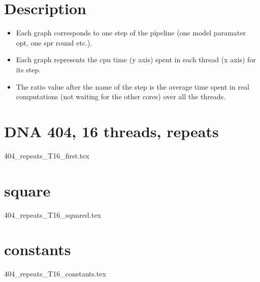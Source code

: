 \documentclass[12pt,a4paper]{article}
\begin{document}
\newcommand*{\figuretitle}[1]{%
    {\centering%
    \textbf{#1}%
    \par\medskip}%
}

\section{Description}
\begin{itemize}
\item Each graph  corresponds to one step of the pipeline (one model paramater opt, one spr round etc.).
\item Each graph represents the cpu time (y axis) spent in each thread (x axis) for its step.
\item The ratio value after the name of the step is the average time spent in real computations (not waiting for the other cores) over all the threads. 
\end{itemize}



\section{DNA 404, 16 threads,  repeats} 
{404_repeats_T16_first.tex}
\section{square} 
{404_repeats_T16_squared.tex}
\section{constants} 
{404_repeats_T16_constants.tex}
\end{document}
